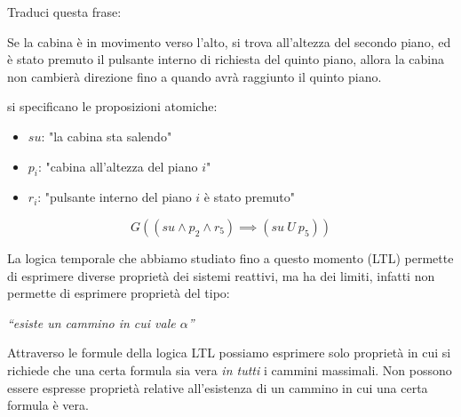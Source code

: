 \begin{esempio}
    Traduci questa frase:
    \begin{center}
        Se la cabina è in movimento verso l'alto, si trova all'altezza del
        secondo piano, ed è stato premuto il pulsante interno di richiesta del
        quinto piano, allora la cabina non cambierà direzione fino a quando avrà
        raggiunto il quinto piano.
    \end{center}
    si specificano le proposizioni atomiche:
    \begin{itemize}
        \item $su$: "la cabina sta salendo"
        \item $p_i$: "cabina all'altezza del piano $i$"
        \item $r_i$: "pulsante interno del piano $i$ è stato premuto"
    \end{itemize}
    \begin{equation}
        G((su \land p_2 \land r_5)\implies(su \ U \ p_5))
    \end{equation}
\end{esempio}
La logica temporale che abbiamo studiato fino a questo momento (LTL) permette di
esprimere diverse proprietà dei sistemi reattivi, ma ha dei limiti, infatti non
permette di esprimere proprietà del tipo:
\begin{center}
    \emph{``esiste un cammino in cui vale $\alpha$''}
\end{center}
Attraverso le formule della logica LTL possiamo esprimere solo proprietà in cui
si richiede che una certa formula sia vera \textit{in tutti} i cammini massimali.
Non possono essere espresse proprietà relative all'esistenza di un cammino in cui
una certa formula è vera.

